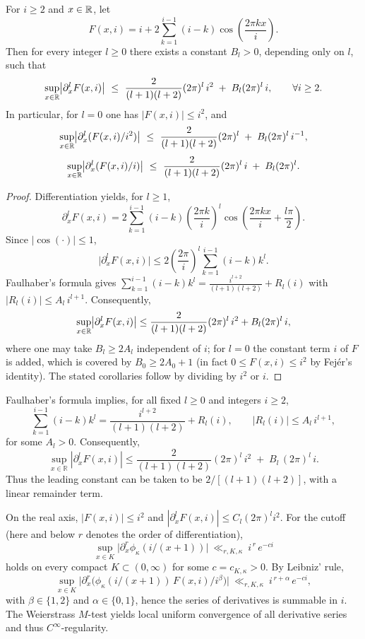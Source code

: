 \begin{proposition}\label{prop:fejer-bounds}
For $i\ge2$ and $x\in\mathbb{R}$, let
\[
F(x,i)= i + 2\sum_{k=1}^{i-1}(i-k)\cos\!\left(\frac{2\pi k x}{i}\right).
\]
Then for every integer $l\ge0$ there exists a constant $B_l>0$, depending only on $l$, such that
\[
\sup_{x\in\mathbb{R}}\bigl| \partial_x^l F(x,i) \bigr|
\ \le\ \frac{2}{(l+1)(l+2)}(2\pi)^l\,i^{2}\;+\;B_l(2\pi)^l\,i,
\qquad \forall i\ge2.
\]
In particular, for $l=0$ one has $|F(x,i)|\le i^2$, and
\[
\sup_{x\in\R}\bigl| \partial_x^l (F(x,i)/i^2) \bigr| \ \le\ \frac{2}{(l+1)(l+2)}(2\pi)^l\;+\;B_l(2\pi)^l\,i^{-1},
\]
\[
\sup_{x\in\R}\bigl| \partial_x^l (F(x,i)/i) \bigr| \ \le\ \frac{2}{(l+1)(l+2)}(2\pi)^l\,i\;+\;B_l(2\pi)^l.
\]
\begin{proof}
Differentiation yields, for $l\ge1$,
\[
\partial_x^l F(x,i)=2\sum_{k=1}^{i-1}(i-k)\left(\frac{2\pi k}{i}\right)^{\!l}
\cos\!\left(\frac{2\pi k x}{i}+\frac{l\pi}{2}\right).
\]
Since $|\cos(\cdot)|\le 1$,
\[
\bigl|\partial_x^l F(x,i)\bigr|
\le 2\left(\frac{2\pi}{i}\right)^{\!l}\sum_{k=1}^{i-1}(i-k)k^l.
\]
Faulhaber's formula gives $\sum_{k=1}^{i-1}(i-k)k^l=\frac{i^{l+2}}{(l+1)(l+2)}+R_l(i)$ with $|R_l(i)|\le A_l\,i^{l+1}$. Consequently,
\[
\sup_{x\in\mathbb{R}}\bigl|\partial_x^l F(x,i)\bigr|
\le \frac{2}{(l+1)(l+2)}(2\pi)^l\,i^{2}+B_l(2\pi)^l\,i,
\]
where one may take $B_l\ge 2A_l$ independent of $i$; for $l=0$ the constant term $i$ of $F$ is added, which is covered by $B_0\ge 2A_0+1$ (in fact $0\le F(x,i)\le i^2$ by Fejér's identity). The stated corollaries follow by dividing by $i^2$ or $i$.
\end{proof}
\end{proposition}

\begin{remark}
Faulhaber’s formula implies, for all fixed $l\ge 0$ and integers $i\ge 2$,
\[
\sum_{k=1}^{i-1}(i-k)k^l=\frac{i^{l+2}}{(l+1)(l+2)}+R_{l}(i),\qquad |R_{l}(i)|\le A_l\,i^{l+1},
\]
for some $A_l>0$. Consequently,
\[
\sup_{x\in\mathbb{R}}|\partial_x^l F(x,i)|
\le \frac{2}{(l+1)(l+2)}(2\pi)^l\, i^{2}\;+\;B_l\,(2\pi)^l\, i.
\]
Thus the leading constant can be taken to be $2/[(l+1)(l+2)]$, with a linear remainder term.
\end{remark}


\begin{remark}\label{rem:mtest-blueprint}
On the real axis, $|F(x,i)|\le i^2$ and $|\partial_x^l F(x,i)|\le C_l(2\pi)^l i^2$. For the cutoff (here and below $r$ denotes the order of differentiation),
\[
\sup_{x\in K}\bigl|\partial_x^r \phi_\kappa(i/(x{+}1))\bigr|\ \ll_{r,K,\kappa}\ i^{\,r}\,e^{-c i}
\]
holds on every compact $K\subset(0,\infty)$ for some $c=c_{K,\kappa}>0$. By Leibniz' rule,
\[
\sup_{x\in K}\bigl|\partial_x^r\bigl(\phi_\kappa(i/(x{+}1))\,F(x,i)/i^\beta\bigr)\bigr|\ \ll_{r,K,\kappa}\ i^{\,r+\alpha}\,e^{-c i},
\]
with $\beta\in\{1,2\}$ and $\alpha\in\{0,1\}$, hence the series of derivatives is summable in $i$. The Weierstrass $M$-test yields local uniform convergence of all derivative series and thus $C^\infty$-regularity.
\end{remark}

